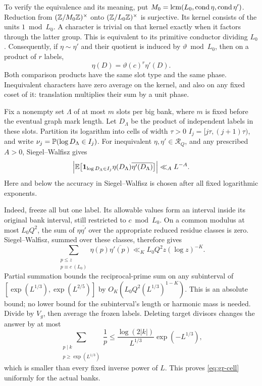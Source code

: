 To verify the equivalence and its meaning, put
\(M_0=\operatorname{lcm}(L_0,\operatorname{cond}\eta,\operatorname{cond}\eta')\).
Reduction from \((\mathbb Z/M_0\mathbb Z)^\times\) onto
\((\mathbb Z/L_0\mathbb Z)^\times\) is surjective.  Its kernel consists of the
units \(1\bmod L_0\).  A character is trivial on that kernel exactly
when it factors through the latter group.  This is equivalent to
its primitive conductor dividing \(L_0\). Consequently, if
\(\eta\sim\eta'\) and their quotient is induced by
\(\vartheta\bmod L_0\), then on a product of \(r\) labels,
\[
                 \eta(D)=\vartheta(c)^r\eta'(D).
\]
Both comparison products have the same slot type and the same phase.
Inequivalent characters have zero average on the kernel, and also
on any fixed coset of it: translation multiplies their sum by a unit phase.

Fix a nonempty set \(\Lambda\) of at most \(m\) slots per big bank,
where \(m\) is fixed before the eventual graph mark length.
Let \(D_\Lambda\) be the product of independent labels in these slots.
Partition its logarithm into cells of width \(\tau>0\)
\(I_j=[j\tau,(j+1)\tau)\), and write
\(\nu_j=\mathbb P(\log D_\Lambda\in I_j)\).
For inequivalent \(\eta,\eta'\in\mathcal R_Q\), and any prescribed
\(A>0\), Siegel--Walfisz gives
\begin{equation}
 \left|\mathbb E\big[
  \mathbf 1_{\log D_\Lambda\in I_j}
        \eta(D_\Lambda)\overline{\eta'(D_\Lambda)}\big]\right|
       \ll_A L^{-A}.                                  \label{eq:gr-cell}
\end{equation}
Here and below the accuracy in Siegel--Walfisz is chosen after all
fixed logarithmic exponents.

Indeed, freeze all but one label.  Its allowable values form an
interval inside its original bank interval, still restricted to
\(c\bmod L_0\). On a common modulus at most \(L_0Q^2\), the sum of
\(\eta\overline{\eta'}\) over the appropriate reduced residue classes
is zero.  Siegel--Walfisz, summed over these classes, therefore gives
\[
 \sum_{\substack{p\le z\\p\equiv c\ (L_0)}}
       \eta(p)\overline{\eta'(p)}
       \ll_K L_0Q^2z(\log z)^{-K}.
\]
Partial summation bounds the reciprocal-prime sum on any subinterval
of \([\exp(L^{1/3}),\exp(L^{2/5})]\) by
\(O_K(L_0Q^2(L^{1/3})^{1-K})\).
This is an absolute bound; no lower bound for the subinterval's
length or harmonic mass is needed.  Divide by \(V_g\), then average
the frozen labels.  Deleting target divisors changes the answer by at most
\begin{equation}
 \sum_{\substack{p\mid k\\p\ge\exp(L^{1/3})}}\frac1p
 \le \frac{\log(2|k|)}{L^{1/3}}\exp(-L^{1/3}),               \label{eq:gr-deletion}
\end{equation}
which is smaller than every fixed inverse power of \(L\).
This proves \eqref{eq:gr-cell} uniformly for the actual banks.

